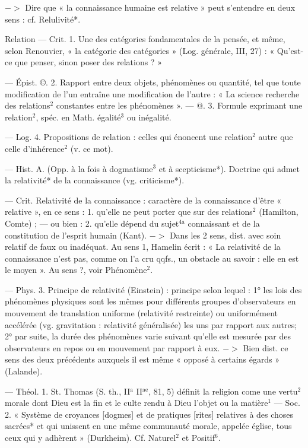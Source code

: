 \begin{itemize}[leftmargin=1cm, label=, itemsep=1pt]
$->$ Dire que « la connaissance
humaine est relative » peut s’entendre en deux sens : cf. Relulivité*.

Relation\ib{} — Crit. 1. Une des catégories fondamentales de la pensée,
et même, selon Renouvier, « la
catégorie des catégories » (Log. générale, III, 27) : « Qu'est-ce que penser,
sinon poser des relations ? »

— Épist. ©. 2. Rapport entre
deux objets, phénomènes ou quantité,
tel que toute modification de
l’un entraîne une modification de
l’autre : « La science recherche des
relations$^2$ constantes entre les phénomènes ». — @. 3. Formule exprimant une relation$^2$, spéc. en Math.
égalité$^3$ ou inégalité.

— Log. 4. Propositions de relation : celles qui énoncent une relation$^2$ autre que celle d’inhérence$^2$
(v. ce mot).

 — Hist. A. (Opp. à la
fois à dogmatisme$^3$ et à scepticisme*).
Doctrine qui admet la relativité* de
la connaissance (vg. criticisme*).

 — Crit. Relativité de la
connaissance : caractère de la connaissance d’être « relative », en ce
sens : 1. qu’elle ne peut porter que
sur des relations$^2$ (Hamilton, Comte) ;
— ou bien : 2. qu’elle dépend du
sujet$^\text{4a}$ connaissant et de la constitution de l'esprit humain (Kant).
$->$ Dans les 2 sens, dist. avec soin
relatif de faux ou inadéquat. Au
sens 1, Hamelin écrit : « La relativité
de la connaissance n’est pas, comme
on l’a cru qqfs., un obstacle au
savoir : elle en est le moyen ». Au
sens ?, voir Phénomène$^2$.

— Phys. 3. Principe de relativité
(Einstein) : principe selon lequel :
1° les lois des phénomènes physiques
sont les mêmes pour différents
groupes d’observateurs en mouvement de translation uniforme (relativité restreinte) ou uniformément
accélérée (vg. gravitation : relativité
généralisée) les uns par rapport aux
autres; 2° par suite, la durée des
phénomènes varie suivant qu’elle
est mesurée par des observateurs
en repos ou en mouvement par rapport à eux. $->$ Bien dist. ce sens
des deux précédents auxquels il est
même « opposé à certains égards »
(Lalande).


 — Théol. 1. St. Thomas (S.
th., II$^\text{a}$ II$^\text{ae}$, 81, 5) définit la religion
come une vertu$^2$ morale dont Dieu
est la fin et le culte rendu à Dieu
l’objet ou la matière$^1$ — Soc. 2.
« Système de croyances [dogmes] et
de pratiques [rites] relatives à des
choses sacrées* et qui unissent en
une même communauté morale,
appelée église, tous ceux qui y
adhèrent » (Durkheim). Cf. Naturel$^2$
et Positif$^6$.


\end{itemize}
